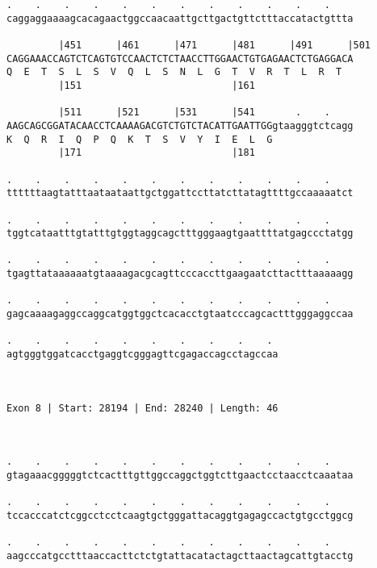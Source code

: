\documentclass{article}
\begin{document}
\begin{Verbatim}
.    .    .    .    .    .    .    .    .    .    .    .    
caggaggaaaagcacagaactggccaacaattgcttgactgttctttaccatactgttta
                                                            
         |451      |461      |471      |481      |491      |501
CAGGAAACCAGTCTCAGTGTCCAACTCTCTAACCTTGGAACTGTGAGAACTCTGAGGACA
Q  E  T  S  L  S  V  Q  L  S  N  L  G  T  V  R  T  L  R  T  
         |151                          |161                 
  
         |511      |521      |531      |541       .    .    
AAGCAGCGGATACAACCTCAAAAGACGTCTGTCTACATTGAATTGGgtaagggtctcagg
K  Q  R  I  Q  P  Q  K  T  S  V  Y  I  E  L  G              
         |171                          |181                 
  
.    .    .    .    .    .    .    .    .    .    .    .    
ttttttaagtatttaataataattgctggattccttatcttatagttttgccaaaaatct
                                                            
.    .    .    .    .    .    .    .    .    .    .    .    
tggtcataatttgtatttgtggtaggcagctttgggaagtgaattttatgagccctatgg
                                                            
.    .    .    .    .    .    .    .    .    .    .    .    
tgagttataaaaaatgtaaaagacgcagttcccaccttgaagaatcttactttaaaaagg
                                                            
.    .    .    .    .    .    .    .    .    .    .    .    
gagcaaaagaggccaggcatggtggctcacacctgtaatcccagcactttgggaggccaa
                                                            
.    .    .    .    .    .    .    .    .    . 
agtgggtggatcacctgaggtcgggagttcgagaccagcctagccaa
                                               
                                               
 
Exon 8 | Start: 28194 | End: 28240 | Length: 46



.    .    .    .    .    .    .    .    .    .    .    .    
gtagaaacgggggtctcactttgttggccaggctggtcttgaactcctaacctcaaataa
                                                            
.    .    .    .    .    .    .    .    .    .    .    .    
tccacccatctcggcctcctcaagtgctgggattacaggtgagagccactgtgcctggcg
                                                            
.    .    .    .    .    .    .    .    .    .    .    .    
aagcccatgcctttaaccacttctctgtattacatactagcttaactagcattgtacctg
                                                            

\end{Verbatim}
\end{document}
